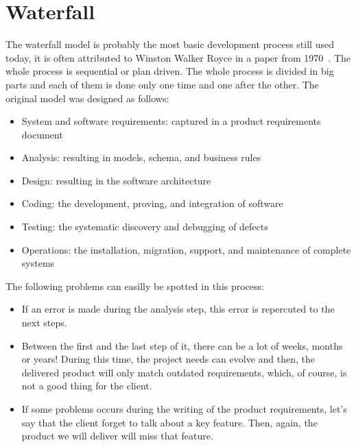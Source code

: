 \documentclass[12pt]{article}
\theoremstyle{definition}
\theoremstyle{definition}
\theoremstyle{remark}
\begin{document}
\clearpage



\section{Waterfall}


The waterfall model is probably the most basic development process still used today, it is often attributed to Winston Walker Royce in a paper from 1970~\cite{BARYWBoehm:1987}. The whole process is sequential or plan driven. The whole process is divided in big parts and each of them is done only one time and one after the other. The original model was designed as follows:\\

\begin{itemize}

\item System and software requirements: captured in a product requirements document
\item Analysis: resulting in models, schema, and business rules
\item Design: resulting in the software architecture
\item Coding: the development, proving, and integration of software
\item Testing: the systematic discovery and debugging of defects
\item Operations: the installation, migration, support, and maintenance of complete systems

\end{itemize}

The following problems can easilly be spotted in this process:

\begin{itemize}

\item If an error is made during the analysis step, this error is repercuted to the next steps.
\item Between the first and the last step of it, there can be a lot of weeks, months or years! During this time, the project needs can evolve and then, the delivered product will only match outdated requirements, which, of course, is not a good thing for the client.
\item If some problems occurs during the writing of the product requirements, let's say that the client forget to talk about a key feature. Then, again, the product we will deliver will miss that feature.

\end{itemize}
\end{document}
